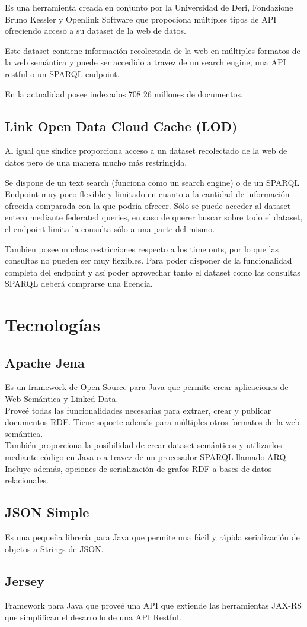 Es una herramienta creada en conjunto por la Universidad de Deri,  Fondazione Bruno Kessler y Openlink Software que propociona 
múltiples tipos de API ofreciendo acceso a su dataset de la web de datos. 

Este dataset contiene información recolectada de la web en múltiples formatos de la web semántica y puede ser accedido a travez 
de un search engine, una API restful o un SPARQL endpoint. 

En la actualidad posee indexados 708.26 millones de documentos.

\subsection{Link Open Data Cloud Cache (LOD)} 

Al igual que sindice proporciona acceso a un dataset recolectado de la web de datos pero de una manera mucho más restringida. 

Se dispone de un text search (funciona como un search engine) o de un SPARQL Endpoint muy poco flexible y limitado en cuanto a 
la cantidad de información ofrecida comparada con la que podría ofrecer. Sólo se puede acceder al dataset entero mediante federated
queries, en caso de querer buscar sobre todo el dataset, el endpoint limita la consulta sólo a una parte del mismo. 

Tambien posee muchas restricciones respecto a los time outs, por lo que las consultas no pueden ser muy flexibles.
Para poder disponer de la funcionalidad completa del endpoint y así poder aprovechar tanto el dataset como las consultas SPARQL 
deberá comprarse una licencia.


\section{Tecnologías}

\subsection{Apache Jena}

Es un framework de Open Source para Java que permite crear aplicaciones de Web Semántica y Linked Data. \\
Proveé todas las funcionalidades necesarias para extraer, crear y publicar documentos RDF. Tiene soporte además para múltiples otros 
formatos de la web semántica. \\
También proporciona la posibilidad de crear dataset semánticos y utilizarlos mediante código en Java o a travez de un procesador SPARQL 
llamado ARQ.\\
Incluye además, opciones de serialización de grafos RDF a bases de datos relacionales.

\subsection{JSON Simple}

Es una pequeña librería para Java que permite una fácil y rápida serialización de objetos a 
Strings de JSON.

\subsection{Jersey}

Framework para Java que proveé una API que extiende las herramientas JAX-RS que simplifican el 
desarrollo de una API Restful. 
